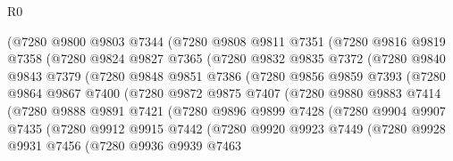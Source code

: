 \begin{lexlean}{R0}
\begin{coremodule}
            (@7280
              @9800
              @9803
              @7344
              (@7280
                @9808
                @9811
                @7351
                (@7280
                  @9816
                  @9819
                  @7358
                  (@7280
                    @9824
                    @9827
                    @7365
                    (@7280
                      @9832
                      @9835
                      @7372
                      (@7280
                        @9840
                        @9843
                        @7379
                        (@7280
                          @9848
                          @9851
                          @7386
                          (@7280
                            @9856
                            @9859
                            @7393
                            (@7280
                              @9864
                              @9867
                              @7400
                              (@7280
                                @9872
                                @9875
                                @7407
                                (@7280
                                  @9880
                                  @9883
                                  @7414
                                  (@7280
                                    @9888
                                    @9891
                                    @7421
                                    (@7280
                                      @9896
                                      @9899
                                      @7428
                                      (@7280
                                        @9904
                                        @9907
                                        @7435
                                        (@7280
                                          @9912
                                          @9915
                                          @7442
                                          (@7280
                                            @9920
                                            @9923
                                            @7449
                                            (@7280
                                              @9928
                                              @9931
                                              @7456
                                              (@7280
                                                @9936
                                                @9939
                                                @7463

\end{coremodule}
\end{lexlean}
